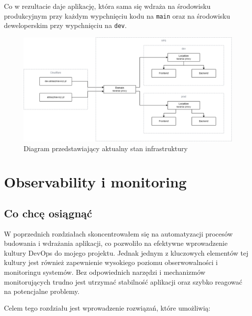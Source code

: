 \documentclass{article}
\begin{document}
Co w rezultacie daje aplikację, która sama się wdraża na środowisku produkcyjnym przy każdym wypchnięciu kodu na \lstinline|main| oraz na środowisku deweloperskim przy wypchnięciu na \lstinline|dev|.

\begin{figure}[H]
    \centering
    \includegraphics[width=1\linewidth]{diagramInfrasturkturaPolowaPracy.png}
    \caption{Diagram przedstawiający aktualny stan infrastruktury}
    \label{fig:enter-label}
\end{figure}


\section{Observability i monitoring}
\subsection{Co chcę osiągnąć}

W poprzednich rozdziałach skoncentrowałem się na automatyzacji procesów budowania i wdrażania aplikacji, co pozwoliło na efektywne wprowadzenie kultury DevOps do mojego projektu. Jednak jednym z kluczowych elementów tej kultury jest również zapewnienie wysokiego poziomu obserwowalności i monitoringu systemów. Bez odpowiednich narzędzi i mechanizmów monitorujących trudno jest utrzymać stabilność aplikacji oraz szybko reagować na potencjalne problemy.

Celem tego rozdziału jest wprowadzenie rozwiązań, które umożliwią:
\end{document}
